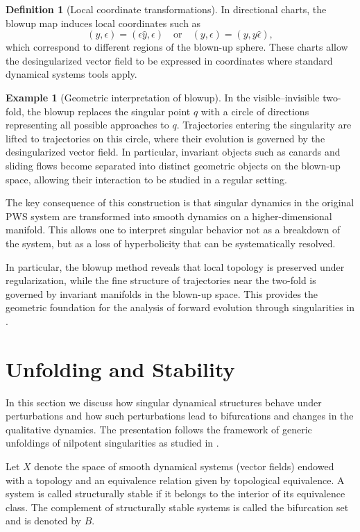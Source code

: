 \documentclass[12pt, a4paper, oneside]{book}
\theoremstyle{plain}
\theoremstyle{definition}
\newtheorem{definition}[theorem]{Definition}
\newtheorem{example}[theorem]{Example}
\theoremstyle{remark}
\theoremstyle{definition}
\begin{document}
\begin{definition}[Local coordinate transformations]
In directional charts, the blowup map induces local coordinates such as
\[
(y,\epsilon) = (\epsilon \hat{y}, \epsilon) \quad \text{or} \quad (y,\epsilon) = (y, y \hat{\epsilon}),
\]
which correspond to different regions of the blown-up sphere. These charts allow the desingularized vector field to be expressed in coordinates where standard dynamical systems tools apply.
\end{definition}

\begin{example}[Geometric interpretation of blowup]
In the visible–invisible two-fold, the blowup replaces the singular point $q$ with a circle of directions representing all possible approaches to $q$. Trajectories entering the singularity are lifted to trajectories on this circle, where their evolution is governed by the desingularized vector field. In particular, invariant objects such as canards and sliding flows become separated into distinct geometric objects on the blown-up space, allowing their interaction to be studied in a regular setting.
\end{example}

The key consequence of this construction is that singular dynamics in the original PWS system are transformed into smooth dynamics on a higher-dimensional manifold. This allows one to interpret singular behavior not as a breakdown of the system, but as a loss of hyperbolicity that can be systematically resolved.

In particular, the blowup method reveals that local topology is preserved under regularization, while the fine structure of trajectories near the two-fold is governed by invariant manifolds in the blown-up space. This provides the geometric foundation for the analysis of forward evolution through singularities in \cite{kristiansen2019resolution}.

\section{Unfolding and Stability}

In this section we discuss how singular dynamical structures behave under perturbations and how such perturbations lead to bifurcations and changes in the qualitative dynamics. The presentation follows the framework of generic unfoldings of nilpotent singularities as studied in \cite{ibanez2005shil}.

Let $X$ denote the space of smooth dynamical systems (vector fields) endowed with a topology and an equivalence relation given by topological equivalence. A system is called structurally stable if it belongs to the interior of its equivalence class. The complement of structurally stable systems is called the bifurcation set and is denoted by $B$.
\end{document}
